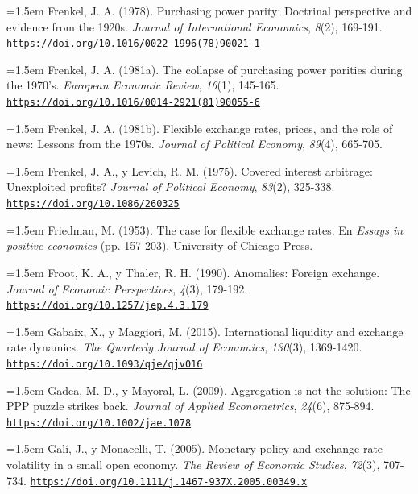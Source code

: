 \documentclass[10pt,a4paper]{article}
\begin{document}
\noindent\hangindent=1.5em Frenkel, J. A. (1978). Purchasing power parity: Doctrinal perspective and evidence from the 1920s. \textit{Journal of International Economics}, \textit{8}(2), 169-191. \href{https://doi.org/10.1016/0022-1996(78)90021-1}{\nolinkurl{https://doi.org/10.1016/0022-1996(78)90021-1}}

\noindent\hangindent=1.5em Frenkel, J. A. (1981a). The collapse of purchasing power parities during the 1970's. \textit{European Economic Review}, \textit{16}(1), 145-165. \href{https://doi.org/10.1016/0014-2921(81)90055-6}{\nolinkurl{https://doi.org/10.1016/0014-2921(81)90055-6}}

\noindent\hangindent=1.5em Frenkel, J. A. (1981b). Flexible exchange rates, prices, and the role of news: Lessons from the 1970s. \textit{Journal of Political Economy}, \textit{89}(4), 665-705.

\noindent\hangindent=1.5em Frenkel, J. A., y Levich, R. M. (1975). Covered interest arbitrage: Unexploited profits? \textit{Journal of Political Economy}, \textit{83}(2), 325-338. \href{https://doi.org/10.1086/260325}{\nolinkurl{https://doi.org/10.1086/260325}}

\noindent\hangindent=1.5em Friedman, M. (1953). The case for flexible exchange rates. En \textit{Essays in positive economics} (pp. 157-203). University of Chicago Press.

\noindent\hangindent=1.5em Froot, K. A., y Thaler, R. H. (1990). Anomalies: Foreign exchange. \textit{Journal of Economic Perspectives}, \textit{4}(3), 179-192. \href{https://doi.org/10.1257/jep.4.3.179}{\nolinkurl{https://doi.org/10.1257/jep.4.3.179}}

\noindent\hangindent=1.5em Gabaix, X., y Maggiori, M. (2015). International liquidity and exchange rate dynamics. \textit{The Quarterly Journal of Economics}, \textit{130}(3), 1369-1420. \href{https://doi.org/10.1093/qje/qjv016}{\nolinkurl{https://doi.org/10.1093/qje/qjv016}}

\noindent\hangindent=1.5em Gadea, M. D., y Mayoral, L. (2009). Aggregation is not the solution: The PPP puzzle strikes back. \textit{Journal of Applied Econometrics}, \textit{24}(6), 875-894. \href{https://doi.org/10.1002/jae.1078}{\nolinkurl{https://doi.org/10.1002/jae.1078}}

\noindent\hangindent=1.5em Galí, J., y Monacelli, T. (2005). Monetary policy and exchange rate volatility in a small open economy. \textit{The Review of Economic Studies}, \textit{72}(3), 707-734. \href{https://doi.org/10.1111/j.1467-937X.2005.00349.x}{\nolinkurl{https://doi.org/10.1111/j.1467-937X.2005.00349.x}}
\end{document}
